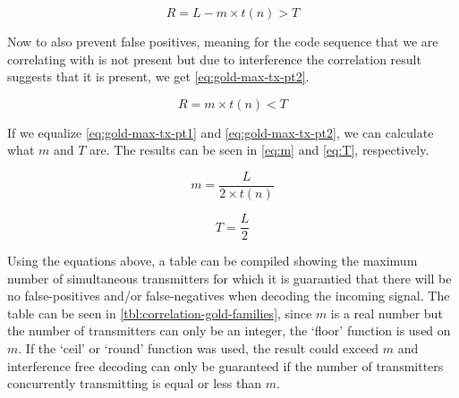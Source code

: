 \begin{equation}
	\label{eq:gold-max-tx-pt1}
	R = L - m \times t(n) > T
\end{equation}

Now to also prevent false positives, meaning for the code sequence that we are correlating with is not present but due to interference the correlation result suggests that it is present, we get \autoref{eq:gold-max-tx-pt2}.


\begin{equation}
	\label{eq:gold-max-tx-pt2}
	R = m \times t(n) < T
\end{equation}

If we equalize \autoref{eq:gold-max-tx-pt1} and \autoref{eq:gold-max-tx-pt2}, we can calculate what $m$ and $T$ are.
The results can be seen in \autoref{eq:m} and \autoref{eq:T}, respectively.


\begin{equation}
	\label{eq:m}
	m = \frac{L}{2 \times t(n)}
\end{equation}

\begin{equation}
	\label{eq:T}
	T = \frac{L}{2}
\end{equation}


Using the equations above, a table can be compiled showing the maximum number of simultaneous transmitters for which it is guarantied that there will be no false-positives and/or false-negatives when decoding the incoming signal.
The table can be seen in \autoref{tbl:correlation-gold-families}, since $m$ is a real number but the number of transmitters can only be an integer, the `floor' function is used on $m$. If the `ceil' or `round' function was used, the result could exceed $m$ and interference free decoding can only be guaranteed if the number of transmitters concurrently transmitting is equal or less than $m$.



